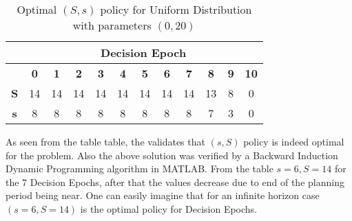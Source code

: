 \documentclass[11pt,a4paper,oneside]{report}
\begin{document}
\begin{table}[]
\centering
\caption{Optimal $(S,s)$ policy for Uniform Distribution with parameters $(0,20)$}
\label{t5}
\begin{tabular}{|c|c|c|c|c|c|c|c|c|c|c|c|}
\hline
           & \multicolumn{11}{c|}{\textbf{Decision Epoch}}                                                                                                 \\ \hline
           & \textbf{0} & \textbf{1} & \textbf{2} & \textbf{3} & \textbf{4} & \textbf{5} & \textbf{6} & \textbf{7} & \textbf{8} & \textbf{9} & \textbf{10} \\ \hline
\textbf{S} & 14         & 14         & 14         & 14         & 14         & 14         & 14         & 14         & 13         & 8          & 0           \\ \hline
\textbf{s} & 8          & 8          & 8          & 8          & 8          & 8          & 8          & 8          & 7          & 3          & 0           \\ \hline
\end{tabular}
\end{table}
As seen from the table table, the validates that $(s,S)$ policy is indeed optimal for the problem. Also the above solution was verified by a Backward Induction Dynamic Programming algorithm in MATLAB. From the table $s=6, S=14$ for the 7 Decision Epochs, after that the values decrease due to end of the planning period being near. One can easily imagine that for an infinite horizon case $(s=6, S=14)$ is the optimal policy for Decision Epochs. 
\end{document}
